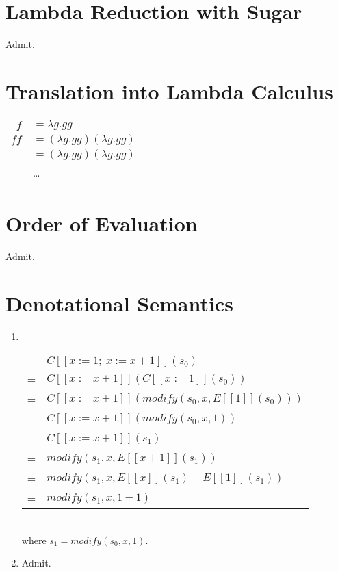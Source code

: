 \section{Lambda Reduction with Sugar}
Admit.


\section{Translation into Lambda Calculus}
\begin{tabular}{rl}
   $f$ & $ = \lambda g.gg $ \\
  $ff$ & $ = (\lambda g.gg)(\lambda g.gg) $ \\
       & $ = (\lambda g.gg)(\lambda g.gg) $ \\
       & \ldots \\
\end{tabular}


\section{Order of Evaluation}
Admit.


\section{Denotational Semantics}
\begin{enumerate}
  \item \ \\
  \begin{tabular}{rl}
      & $ C[[x:=1;\ x:=x+1]](s_{0}) $ \\
    = & $ C[[x:=x+1]](C[[x:=1]](s_{0})) $ \\
    = & $ C[[x:=x+1]](modify(s_{0}, x, E[[1]](s_{0}))) $ \\
    = & $ C[[x:=x+1]](modify(s_{0}, x, 1)) $ \\
    = & $ C[[x:=x+1]](s_{1}) $ \\
    = & $ modify(s_{1}, x, E[[x+1]](s_{1})) $ \\
    = & $ modify(s_{1}, x, E[[x]](s_{1}) + E[[1]](s_{1})) $ \\
    = & $ modify(s_{1}, x, 1+1) $ \\
  \end{tabular} \\
  where $ s_{1} = modify(s_{0}, x, 1) $.

  \item Admit.
\end{enumerate}


